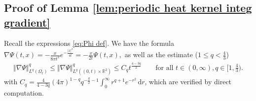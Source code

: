 \documentclass[11pt,a4paper,reqno]{amsart}
\theoremstyle{remark}
\theoremstyle{definition}
\numberwithin{equation}{section}
\renewcommand{\d}{\, \mathrm{d} }
\begin{document}
\subsection{Proof of Lemma \ref{lem:periodic heat kernel integ gradient}}\label{app:proff periodic heat kernel}


Recall the expressions \eqref{eq:Phi def}. We have the formula $\nabla \Psi(t,x) = - \frac{x}{8 \pi t^2}e^{-\frac{|x|^2}{4t}} = - \frac{x}{2t}\Psi(t,x),$ as well as the estimate ($1 \leq q < \frac{4}{3}$) 
\begin{equation}\label{eq:Lp bound grad heat kernel}
    \begin{aligned} 
        \Vert \nabla \Psi \Vert_{L^q(\Omega_t)}^q \leq \Vert \nabla \Psi \Vert_{L^q((0,t)\times\mathbb{R}^2)}^q \leq C_q t^{\frac{4-3q}{2}} \qquad \text{for all } t \in (0,\infty),  q \in [1,\frac{4}{3}). 
    \end{aligned}
\end{equation}
with $C_q = \frac{4}{4-3q} (4\pi)^{1-q} q^{-\frac{q}{2}-1}\int_{0}^\infty r^{q+1} e^{-r^2} \d r$, which are verified by direct computation. 
\end{document}
